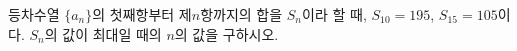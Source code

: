 등차수열 $\{a_n\}$의 첫째항부터 제$n$항까지의 합을 $S_n$이라 할 때, $S_{10}=195$, $S_{15}=105$이다. $S_n$의 값이 최대일 때의 $n$의 값을 구하시오.
